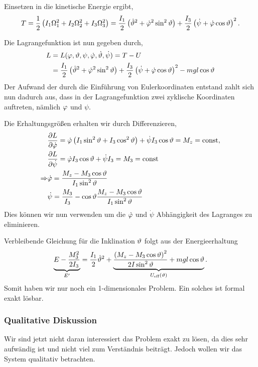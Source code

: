 Einsetzen in die kinetische Energie ergibt,
\begin{align*}
T = \frac{1}{2}\left( I_1\Omega_1^2 + I_2 \Omega_2^2 + I_3\Omega_3^2 \right)
= \frac{I_1}{2}\left( \dot{\vartheta}^2 + \dot{\varphi}^2\sin^2\vartheta \right) +
\frac{I_3}{2}\left( \dot{\psi} + \dot{\varphi}\cos\vartheta\right)^2.
\end{align*}

Die Lagrangefunktion ist nun gegeben durch,
\begin{align*}
L &= L(\varphi,\vartheta,\psi,\dot{\varphi},\dot{\vartheta},\dot{\psi}) = T-U \\ &=
\frac{I_1}{2}\left( \dot{\vartheta}^2 + \dot{\varphi}^2\sin^2\vartheta \right) +
\frac{I_3}{2}\left( \dot{\psi} + \dot{\varphi}\cos\vartheta\right)^2
-mgl\cos\vartheta
\end{align*}
Der Aufwand der durch die Einführung von Eulerkoordinaten entstand zahlt sich
nun dadurch aus, dass in der Lagrangefunktion zwei zyklische Koordinaten
auftreten, nämlich $\varphi$ und $\psi$.

Die Erhaltungsgrößen erhalten wir durch Differenzieren,
\begin{align*}
&\frac{\partial L}{\partial\dot{\varphi}} = \dot{\varphi}\left(I_1 \sin^2\vartheta + I_3
\cos^2\vartheta  \right) + \dot{\psi}I_3 \cos\vartheta = M_z = \mathrm{const},\\
&\frac{\partial L}{\partial\dot{\psi}} = \dot{\varphi}I_3\cos\vartheta + \dot{\psi}I_3 =
M_3 = \mathrm{const}\\
\Rightarrow&\dot{\varphi} = \frac{M_z - M_3\cos\vartheta}{I_1 \sin^2 \vartheta}\\
&\dot{\psi} = \frac{M_3}{I_3} - \cos\vartheta \frac{M_z - M_3\cos\vartheta}{I_1\sin^2\vartheta}
\end{align*}
Dies können wir nun verwenden um die $\dot{\varphi}$ und $\dot{\psi}$ Abhängigkeit
des Lagranges zu eliminieren.

Verbleibende Gleichung für die Inklination $\vartheta$ folgt aus der
Energieerhaltung
\begin{align*}
\underbrace{E - \frac{M_3^2}{2I_3}}_{E'} = \frac{I_1}{2}\dot{\vartheta}^2 +
\underbrace{\frac{\left(M_z - M_3\cos\vartheta\right)^2}{2I\sin^2\vartheta} +
mgl\cos\vartheta}_{U_{\text{eff}}(\vartheta)}.
\end{align*}
Somit haben wir nur noch ein 1-dimensionales Problem. Ein solches ist formal
exakt lösbar.

\subsubsection{Qualitative Diskussion}

Wir sind jetzt nicht daran interessiert das Problem exakt zu lösen, da dies
sehr aufwändig ist und nicht viel zum Verständnis beiträgt.  Jedoch wollen wir
das System qualitativ betrachten.

